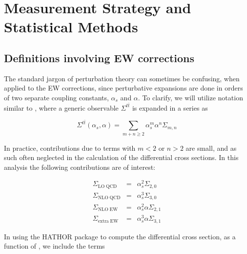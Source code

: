 \clearpage
\section{Measurement Strategy and Statistical Methods}
\label{S:stats}


\subsection{Definitions involving EW corrections}
\label{SS:kfactor}

The standard jargon of perturbation theory can sometimes be confusing, when applied to the EW corrections, since perturbative expansions are done in orders of two separate coupling constants, $\alpha_s$ and $\alpha$. To clarify, we will utilize  notation similar to \cite{Czakon:2017NLOEW}, where a generic observable $\Sigma ^{t\bar{t}}$ is expanded in a series as

\begin{equation}
    \Sigma^{t\bar{t}}(\alpha_s,\alpha)=\sum_{m+n\geq 2} \alpha_s^m \alpha^n \Sigma _{m,n}
\end{equation}

In practice, contributions due to terms with $m<2$ or $n>2$ are small, and as such often neglected in the calculation of the differential cross sections. In this analysis the following contributions are of interest:

\begin{eqnarray}
    \Sigma_\mathrm{LO\; QCD} &=& \alpha_s ^2 \Sigma_{2,0}\\
    \Sigma_\mathrm{NLO\; QCD} &=& \alpha_s ^3 \Sigma_{3,0}\\
    \Sigma_\mathrm{NLO\; EW} &=& \alpha_s ^2 \alpha \Sigma_{2,1}\\
    \Sigma_\mathrm{extra\; EW} &=& \alpha_s ^3 \alpha \Sigma_{3,1}
\end{eqnarray}

In using the \textsc{HATHOR} package to compute the differential cross section, as a function of \yt, we include the terms

